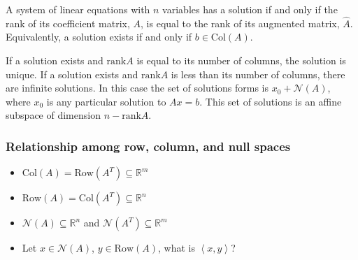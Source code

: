 \documentclass[compress]{beamer}
\def\R{\mathbb{R}}
\newcommand{\iprod}[2]{\left\langle {#1} , {#2} \right\rangle}
\newcommand{\rank}{\mathrm{rank}}
\newcommand{\row}{\mathrm{Row}}
\newcommand{\col}{\mathrm{Col}}
\begin{document}
\begin{frame}
  \begin{theorem} \label{thm:rc} A system of linear
    equations with $n$ variables has a solution if and only if the rank
    of its coefficient matrix, $A$, is equal to the rank of its
    augmented matrix, $\hat{A}$. Equivalently, a solution exists if and
    only if $b \in \col(A)$.
    
    If a solution exists and $\rank A$ is equal to its number of
    columns, the solution is unique. If a solution exists and $\rank A$
    is less than its number of columns, there are infinite solutions. In
    this case the set of solutions forms is $x_0 + \mathcal{N}(A)$,
    where $x_0$ is any particular solution to $A x = b$. This set of
    solutions is an affine subspace of dimension $n - \rank A$.
  \end{theorem}
\end{frame}

\begin{frame}\frametitle{Relationship among row, column, and null
    spaces}
  \begin{itemize}
  \item $\col(A) = \row(A^T) \subseteq \R^m$
  \item $\row(A) = \col(A^T) \subseteq \R^n$
  \item $\mathcal{N}(A) \subseteq \R^n$ and $\mathcal{N}(A^T)
    \subseteq \R^m$
  \item Let $x \in \mathcal{N}(A)$, $y \in \row(A)$, what is
    $\iprod{x}{y}$? 
  \end{itemize}
\end{frame}
\end{document}
